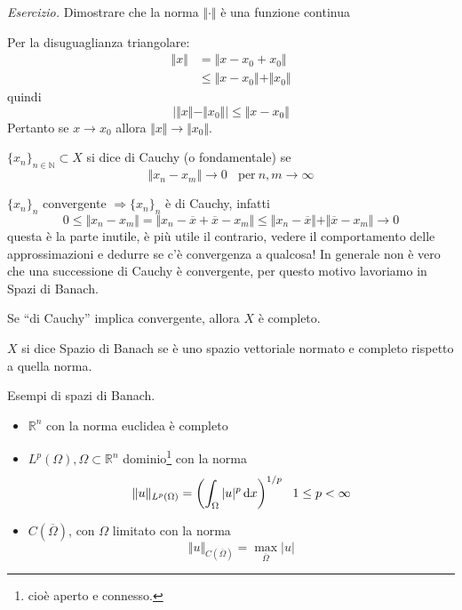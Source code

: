 \textit{Esercizio.} Dimostrare che la norma $\Vert \cdotp \Vert $ è una funzione continua

Per la disuguaglianza triangolare:
\begin{align*}
    \Vert x\Vert & =\Vert x-x_{0} +x_{0}\Vert                     \\
                 & \leq \Vert x-x_{0}\Vert +\Vert x_{0}\Vert
\end{align*}
quindi
\begin{equation*}
    \Big| \Vert x\Vert -\Vert x_{0}\Vert \Big|\leq \Vert x-x_{0}\Vert
\end{equation*}
Pertanto se $x\rightarrow x_{0}$ allora $\Vert x\Vert \rightarrow \Vert x_{0}\Vert $.

\begin{definition}
    $\{x_{n}\}_{n\in \mathbb{N}} \subset X$ si dice di Cauchy (o fondamentale) se
    \begin{equation*}
        \Vert x_{n} -x_{m}\Vert \rightarrow 0\ \ \ \ \text{per} \ n,m\rightarrow \infty
    \end{equation*}
\end{definition}
$\{x_{n}\}_{n}$ convergente $\Rightarrow \{x_{n}\}_{n}$ è di Cauchy, infatti
\begin{equation*}
    0\leq \Vert x_{n} -x_{m}\Vert =\Vert x_{n} -\overline{x} +\overline{x} -x_{m}\Vert \leq \Vert x_{n} -\overline{x}\Vert +\Vert \overline{x} -x_{m}\Vert \rightarrow 0
\end{equation*}
questa è la parte inutile, è più utile il contrario, vedere il comportamento delle approssimazioni e dedurre se c'è convergenza a qualcosa! In generale non è vero che una successione di Cauchy è convergente, per questo motivo lavoriamo in Spazi di Banach.
\begin{definition}
    Se ``di Cauchy'' implica convergente, allora $X$ è completo.
\end{definition}
\begin{definition}
    $X$ si dice Spazio di Banach se è uno spazio vettoriale normato e completo rispetto a quella norma.
\end{definition}
Esempi di spazi di Banach.
\begin{itemize}
    \item $\mathbb{R}^{n}$ con la norma euclidea è completo
    \item $L^{p}(\Omega),\Omega \subset \mathbb{R}^{n}$ dominio\footnote{cioè aperto e connesso.} con la norma
          \begin{equation*}
              \Vert u\Vert _{L^{p}(\Omega)} =\left(\int _{\Omega }| u| ^{p} \,\mathrm d x\right)^{1/p} \ \ 1\leq p< \infty
          \end{equation*}
    \item $C(\overline{\Omega })$, con $\Omega $ limitato con la norma
          \begin{equation*}
              \Vert u\Vert _{C(\overline{\Omega })} =\max_{\overline{\Omega }}| u|
          \end{equation*}
\end{itemize}
